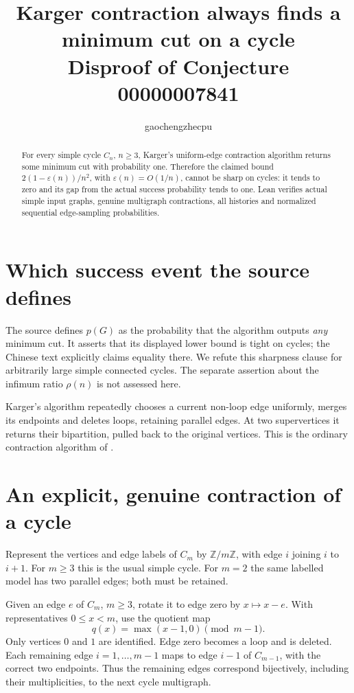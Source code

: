 \documentclass[11pt]{article}
\title{Karger contraction always finds a minimum cut on a cycle\\
\large Disproof of Conjecture 00000007841}
\author{gaochengzhecpu}\date{}
\begin{document}
\maketitle
\begin{abstract}
For every simple cycle $C_n$, $n\geq3$, Karger's
uniform-edge contraction algorithm returns some minimum
cut with probability one. Therefore the claimed bound
$2(1-\varepsilon(n))/n^2$, with $\varepsilon(n)=O(1/n)$,
cannot be sharp on cycles: it tends to zero and its
gap from the actual success probability tends to one.
Lean verifies actual simple input graphs, genuine
multigraph contractions, all histories and normalized
sequential edge-sampling probabilities.
\end{abstract}

\section*{Which success event the source defines}
The source defines $p(G)$ as the probability that the
algorithm outputs \emph{any} minimum cut. It asserts
that its displayed lower bound is tight on cycles;
the Chinese text explicitly claims equality there.
We refute this sharpness clause for arbitrarily large
simple connected cycles. The separate assertion about
the infimum ratio $\rho(n)$ is not assessed here.

Karger's algorithm repeatedly chooses a current
non-loop edge uniformly, merges its endpoints and
deletes loops, retaining parallel edges. At two
supervertices it returns their bipartition, pulled
back to the original vertices. This is the ordinary
contraction algorithm of \cite[Section 2]{karger}.

\section*{An explicit, genuine contraction of a cycle}
Represent the vertices and edge labels of $C_m$ by
$\mathbb Z/m\mathbb Z$, with edge $i$ joining $i$ to
$i+1$. For $m\geq3$ this is the usual simple cycle.
For $m=2$ the same labelled model has two parallel
edges; both must be retained.

Given an edge $e$ of $C_m$, $m\geq3$, rotate it to edge
zero by $x\mapsto x-e$. With representatives
$0\leq x<m$, use the quotient map
\[
 q(x)=\max(x-1,0)\pmod{m-1}.
\]
Only vertices $0$ and $1$ are identified. Edge zero
becomes a loop and is deleted. Each remaining edge
$i=1,\ldots,m-1$ maps to edge $i-1$ of $C_{m-1}$,
with the correct two endpoints. Thus the remaining
edges correspond bijectively, including their
multiplicities, to the next cycle multigraph.
\end{document}

